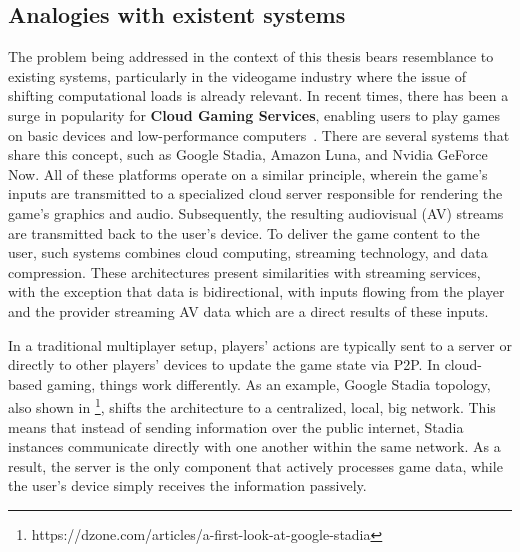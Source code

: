 \subsection{Analogies with existent systems}
\label{ssec:analogies-with-existent-systems}
The problem being addressed in the context of this thesis bears resemblance to existing systems, particularly in the videogame industry where the issue of shifting computational loads is already relevant. In recent times, there has been a surge in popularity for \textbf{Cloud Gaming Services}, enabling users to play games on basic devices and low-performance computers~\cite{6574660}. There are several systems that share this concept, such as Google Stadia, Amazon Luna, and Nvidia GeForce Now. All of these platforms operate on a similar principle, wherein the game's inputs are transmitted to a specialized cloud server responsible for rendering the game's graphics and audio. Subsequently, the resulting audiovisual (AV) streams are transmitted back to the user's device. To deliver the game content to the user, such systems combines cloud computing, streaming technology, and data compression. These architectures present similarities with streaming services, with the exception that data is bidirectional, with inputs flowing from the player and the provider streaming AV data which are a direct results of these inputs.\newline

In a traditional multiplayer setup, players' actions are typically sent to a server or directly to other players' devices to update the game state via P2P. In cloud-based gaming, things work differently. As an example, Google Stadia topology, also shown in  \footnote{https://dzone.com/articles/a-first-look-at-google-stadia}, shifts the architecture to a centralized, local, big network. This means that instead of sending information over the public internet, Stadia instances communicate directly with one another within the same network. As a result, the server is the only component that actively processes game data, while the user's device simply receives the information passively.\newline



